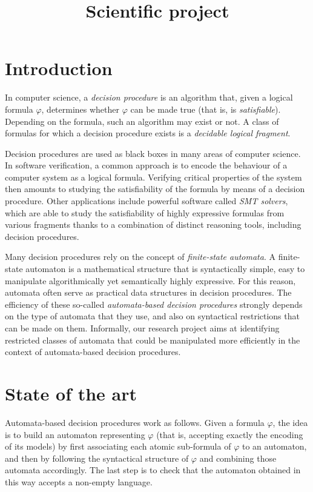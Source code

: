 \documentclass[]{article}
\title{Scientific project}
\author{}
\begin{document}
\maketitle

\section{Introduction}

In computer science, a \textit{decision procedure} is an algorithm that, given a logical formula $\varphi$, determines whether $\varphi$ can be made true (that is, is \textit{satisfiable}). Depending on the formula, such an algorithm may exist or not. A class of formulas for which a decision procedure exists is a \textit{decidable logical fragment}.

Decision procedures are used as black boxes in many areas of computer science. In software verification, a common approach is to encode the behaviour of a computer system as a logical formula. Verifying critical properties of the system then amounts to studying the satisfiability of the formula by means of a decision procedure. Other applications include powerful software called \textit{SMT solvers}, which are able to study the satisfiability of highly expressive formulas from various fragments thanks to a combination of distinct reasoning tools, including decision procedures.

Many decision procedures rely on the concept of \textit{finite-state automata}. A finite-state automaton is a mathematical structure that is syntactically simple, easy to manipulate algorithmically yet semantically highly expressive. For this reason, automata often serve as practical data structures in decision procedures. The efficiency of these so-called \textit{automata-based decision procedures} strongly depends on the type of automata that they use, and also on syntactical restrictions that can be made on them. Informally, our research project aims at identifying restricted classes of automata that could be manipulated more efficiently in the context of automata-based decision procedures.

\section{State of the art}

Automata-based decision procedures work as follows. Given a formula $\varphi$, the idea is to build an automaton representing $\varphi$ (that is, accepting exactly the encoding of its models) by first associating each atomic sub-formula of $\varphi$ to an automaton, and then by following the syntactical structure of $\varphi$ and combining those automata accordingly. The last step is to check that the automaton obtained in this way accepts a non-empty language. 
\end{document}
